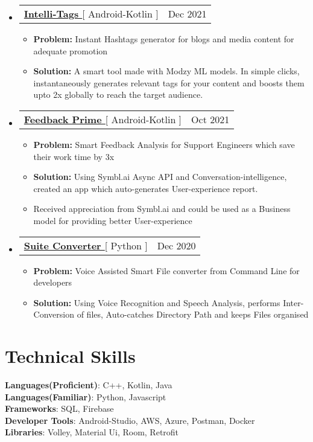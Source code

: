 \documentclass[letterpaper,11pt]{article}
\makeatletter
\newcommand{\resumeItem}[1]{
  \item\small{
    {#1 \vspace{-2pt}}
  }
}
\newcommand{\resumeProjectHeading}[2]{
    \item
    \begin{tabular*}{0.97\textwidth}{l@{\extracolsep{\fill}}r}
      \small#1 & #2 \\
    \end{tabular*}\vspace{-7pt}
}
\newcommand{\resumeSubHeadingListStart}{\begin{itemize}[leftmargin=0.15in, label={}]}
\newcommand{\resumeSubHeadingListEnd}{\end{itemize}}
\newcommand{\resumeItemListStart}{\begin{itemize}}
\newcommand{\resumeItemListEnd}{\end{itemize}\vspace{-5pt}}
\makeatother
\begin{document}
 \resumeSubHeadingListStart
      \resumeProjectHeading
          {\textbf{\href{https://github.com/aniketk13/Intelli-Tags}{\color{blue}Intelli-Tags }}{[ Android-Kotlin ]}}{Dec 2021}
          \resumeItemListStart
          \resumeItem{\textbf{Problem:} Instant Hashtags generator for blogs and media content for adequate promotion}
          \resumeItem{\textbf{Solution:} A smart tool made with Modzy ML models. In simple clicks, instantaneously generates relevant tags for your content and boosts them upto 2x globally to reach the target audience.}
          \resumeItemListEnd
    \resumeSubHeadingListEnd
    
    \resumeSubHeadingListStart
      \resumeProjectHeading
          {\textbf{\href{https://github.com/aniketk13/Feedback-Prime}{\color{blue}Feedback Prime }}{[ Android-Kotlin ]}}{Oct 2021}
          \resumeItemListStart
           \resumeItem{\textbf{Problem:} Smart Feedback Analysis for Support Engineers which save their work time by 3x}
           \resumeItem{\textbf{Solution:} Using Symbl.ai Async API and Conversation-intelligence, created an app which auto-generates User-experience report.}
           \resumeItem{Received appreciation from Symbl.ai and could be used as a Business model for providing better User-experience}
          \resumeItemListEnd
    \resumeSubHeadingListEnd
    
   
    
\resumeSubHeadingListStart
      \resumeProjectHeading
          {\textbf{\href{https://github.com/aniketk13/Suite-Converter}{\color{blue}Suite Converter }}{[ Python ]}}{Dec 2020}
          \resumeItemListStart
           \resumeItem{\textbf{Problem:} Voice Assisted Smart File converter from Command Line for developers}
           \resumeItem{\textbf{Solution:} Using Voice Recognition and Speech Analysis, performs Inter-Conversion of files, Auto-catches Directory Path and keeps Files organised}
          \resumeItemListEnd
    \resumeSubHeadingListEnd



%
\section{Technical Skills}
 \begin{itemize}[leftmargin=0.15in, label={}]
    \small{\item{
     \textbf{Languages(Proficient)}{: C++, Kotlin, Java} \\
      \textbf{Languages(Familiar)}{: Python, Javascript } \\
     \textbf{Frameworks}{: SQL, Firebase  } \\
     \textbf{Developer Tools}{: Android-Studio, AWS, Azure, Postman, Docker } \\
     \textbf{Libraries}{: Volley, Material Ui, Room, Retrofit  }
    }}
 \end{itemize}
\end{document}
